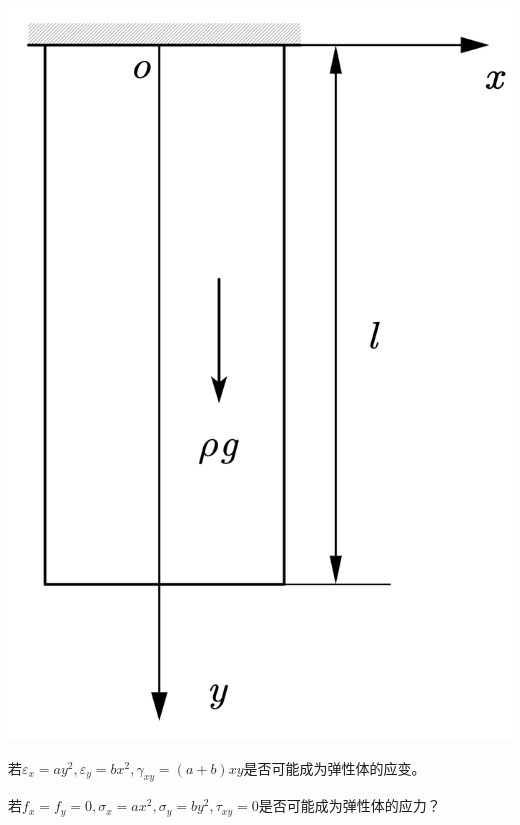 \centerline{\includegraphics[scale=0.5]{figure/2-9.png}}

\begin{example}
	若$\varepsilon _x=ay^2,\varepsilon _y=bx^2,\gamma _{xy}=\left( a+b \right) xy$是否可能成为弹性体的应变。
\end{example}
\begin{remark}
	
\end{remark}
\begin{example}
若$f_x=f_y=0,\sigma _x=ax^2,\sigma _y=by^2,\tau _{xy}=0$是否可能成为弹性体的应力？
\end{example}
\begin{remark}
	
\end{remark}

